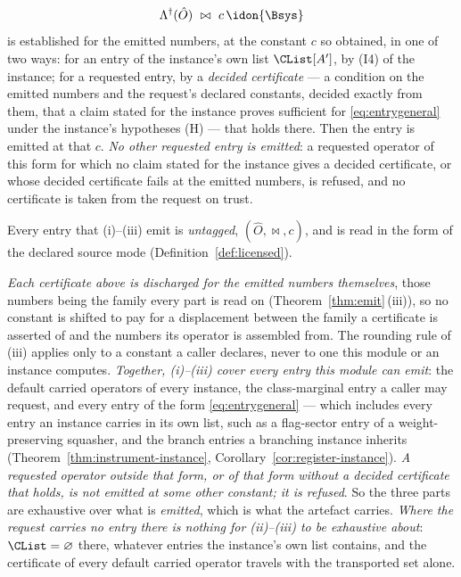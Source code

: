 \begin{corollary}
\begin{enumerate}[label=(\roman*),leftmargin=3.0em]
\begin{equation}
    \Lambda^{\dagger}(\hat O)\ \bowtie\ c\,\idon{\Bsys}
  \end{equation}
  is established for the emitted numbers, at the constant $c$ so obtained, in
  one of two ways: for an entry of the instance's own list $\CList[A']$, by
  (I4) of the instance; for a requested entry, by a \emph{decided
  certificate} --- a condition on the emitted numbers and the request's
  declared constants, decided exactly from them, that a claim stated for the
  instance proves sufficient for \eqref{eq:entrygeneral} under the instance's
  hypotheses (H) --- that holds there. Then the entry is emitted at that $c$.
  \emph{No other requested entry is emitted}: a requested operator of this
  form for which no claim stated for the instance gives a decided
  certificate, or whose decided certificate fails at the emitted numbers, is
  refused, and no certificate is taken from the request on trust.
\end{enumerate}
Every entry that (i)--(iii) emit is \emph{untagged}, $(\hat O,\bowtie,c)$,
and is read in the form of the declared source mode
(Definition~\ref{def:licensed}).

\emph{Each certificate above is discharged for the emitted numbers
themselves}, those numbers being the family every part is read on
(Theorem~\ref{thm:emit}\,(iii)), so no constant is shifted to pay for a
displacement between the family a certificate is asserted of and the numbers
its operator is assembled from. The rounding rule of (iii) applies only to a
constant a caller declares, never to one this module or an instance
computes. \emph{Together, (i)--(iii) cover every entry this module can
emit}: the default carried operators of every instance, the class-marginal
entry a caller may request, and every entry of the form
\eqref{eq:entrygeneral} --- which includes every entry an instance carries in
its own list, such as a flag-sector entry of a weight-preserving squasher,
and the branch entries a branching instance inherits
(Theorem~\ref{thm:instrument-instance},
Corollary~\ref{cor:register-instance}). \emph{A requested operator outside
that form, or of that form without a decided certificate that holds, is not
emitted at some other constant; it is refused}. So the
three parts are
exhaustive over what is \emph{emitted}, which is what the artefact carries.
\emph{Where the request carries no entry there is nothing for (ii)--(iii) to
be exhaustive about}: $\CList=\varnothing$ there, whatever entries the
instance's own list contains, and the certificate of every default carried
operator travels with the transported set alone.
\end{corollary}

